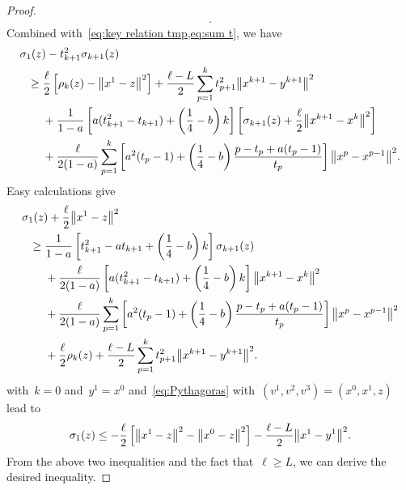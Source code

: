 \documentclass[../main]{subfiles}
\begin{document}
\begin{proof}
\begin{multline}
    .\end{multline}
    Combined with~\cref{eq:key relation tmp,eq:sum t}, we have
    \begin{align}
        \MoveEqLeft \sigma_1(z) - t_{k + 1}^2 \sigma_{k + 1}(z) \\
        \ge{}& \frac{\ell}{2} \left[ \rho_k(z) - \norm*{x^1 - z}^2 \right] + \frac{\ell - L}{2} \sum_{p = 1}^{k} t_{p + 1}^2 \norm*{x^{k + 1} - y^{k + 1}}^2 \\
             &+ \frac{1}{1 - a} \left[ a (t_{k + 1}^2 - t_{k + 1}) + \left( \frac{1}{4} - b \right) k \right] \left[ \sigma_{k + 1}(z) + \frac{\ell}{2} \norm*{x^{k + 1} - x^k}^2 \right] \\
             &+ \frac{\ell}{2 (1 - a)} \sum_{p = 1}^{k} \left[ a^2 (t_p - 1) + \left( \frac{1}{4} - b \right) \frac{p - t_p + a (t_p - 1)}{t_p} \right] \norm*{x^p - x^{p - 1}}^2
    .\end{align}
    Easy calculations give
    \begin{align}
        \MoveEqLeft \sigma_1(z) + \frac{\ell}{2} \norm*{x^1 - z}^2 \\
        \ge{}& \frac{1}{1 - a} \left[ t_{k + 1}^2 - a t_{k + 1} + \left( \frac{1}{4} - b \right) k \right] \sigma_{k + 1}(z) \\
        &+ \frac{\ell}{2 (1 - a)} \left[ a (t_{k + 1}^2 - t_{k + 1}) + \left( \frac{1}{4} - b \right) k \right] \norm*{x^{k + 1} - x^k}^2 \\
        &+ \frac{\ell}{2 (1 - a)} \sum_{p = 1}^{k} \left[ a^2 (t_p - 1) + \left( \frac{1}{4} - b \right) \frac{p - t_p + a(t_p - 1)}{t_p} \right] \norm*{x^p - x^{p - 1}}^2 \\
        &+ \frac{\ell}{2} \rho_k(z) + \frac{\ell - L}{2} \sum_{p = 1}^{k} t_{p + 1}^2 \norm*{x^{k + 1} - y^{k + 1}}^2
    .\end{align}
     with~$k = 0$ and~$y^1 = x^0$ and~\cref{eq:Pythagoras} with~$(v^1, v^2, v^3) = (x^0, x^1, z)$ lead to
    \[
        \sigma_1(z) \le - \frac{\ell}{2} \left[ \norm*{x^1 - z}^2 - \norm*{x^0 - z}^2 \right] - \frac{\ell - L}{2} \norm*{x^1 - y^1}^2
    .\]
    From the above two inequalities and the fact that~$\ell \ge L$, we can derive the desired inequality.
\end{proof}
\end{document}
